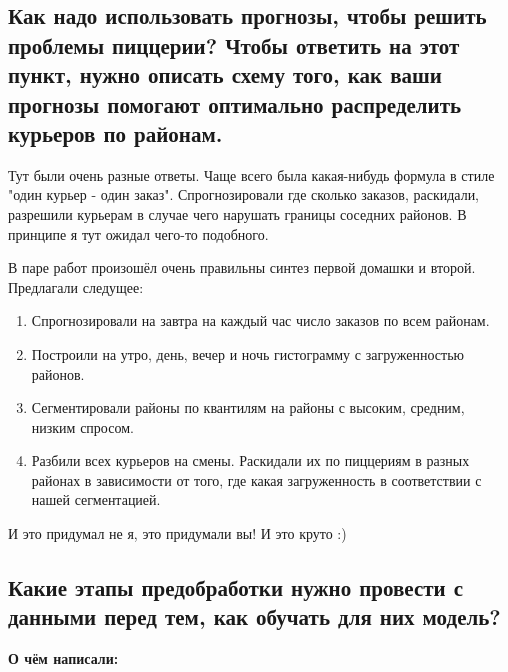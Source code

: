 \documentclass[12pt, a4paper, oneside]{article}
\begin{document}
\subsection*{Как надо использовать прогнозы, чтобы решить проблемы пиццерии? Чтобы ответить на этот пункт, нужно описать схему того, как ваши прогнозы помогают оптимально распределить курьеров по районам.}

Тут были очень разные ответы.  Чаще всего была какая-нибудь формула в стиле "один курьер - один заказ". Спрогнозировали где сколько заказов, раскидали, разрешили курьерам в случае чего нарушать границы соседних районов. В принципе я тут ожидал чего-то подобного.

В паре работ произошёл очень правильны синтез  первой домашки и второй. Предлагали следущее: 

\begin{enumerate}
	\item  Спрогнозировали на завтра на каждый час число заказов по всем районам.  
	\item  Построили на утро, день, вечер и ночь гистограмму с загруженностью районов. 
	\item  Сегментировали районы по квантилям на районы с высоким, средним, низким спросом.
	\item  Разбили всех курьеров на смены. Раскидали их по пиццериям в разных районах в зависимости от того, где какая загруженность в соответствии с нашей сегментацией.	
\end{enumerate}

И это придумал не я, это придумали вы! И это круто :) 

\subsection*{Какие этапы предобработки нужно провести с данными перед тем, как обучать для них модель? }

\textbf{О чём написали:} 
\end{document}
